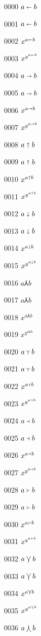 \documentclass{article}
\begin{document}
0000 $a\shortleftarrow b$\par
0001 $\displaystyle a\shortleftarrow b$\par
0002 $x^{a\shortleftarrow b}$\par
0003 $x^{y^{a\shortleftarrow b}}$\par
0004 $a\shortrightarrow b$\par
0005 $\displaystyle a\shortrightarrow b$\par
0006 $x^{a\shortrightarrow b}$\par
0007 $x^{y^{a\shortrightarrow b}}$\par
0008 $a\shortuparrow b$\par
0009 $\displaystyle a\shortuparrow b$\par
0010 $x^{a\shortuparrow b}$\par
0011 $x^{y^{a\shortuparrow b}}$\par
0012 $a\shortdownarrow b$\par
0013 $\displaystyle a\shortdownarrow b$\par
0014 $x^{a\shortdownarrow b}$\par
0015 $x^{y^{a\shortdownarrow b}}$\par
0016 $a\Yup b$\par
0017 $\displaystyle a\Yup b$\par
0018 $x^{a\Yup b}$\par
0019 $x^{y^{a\Yup b}}$\par
0020 $a\Ydown b$\par
0021 $\displaystyle a\Ydown b$\par
0022 $x^{a\Ydown b}$\par
0023 $x^{y^{a\Ydown b}}$\par
0024 $a\Yleft b$\par
0025 $\displaystyle a\Yleft b$\par
0026 $x^{a\Yleft b}$\par
0027 $x^{y^{a\Yleft b}}$\par
0028 $a\Yright b$\par
0029 $\displaystyle a\Yright b$\par
0030 $x^{a\Yright b}$\par
0031 $x^{y^{a\Yright b}}$\par
0032 $a\varcurlyvee b$\par
0033 $\displaystyle a\varcurlyvee b$\par
0034 $x^{a\varcurlyvee b}$\par
0035 $x^{y^{a\varcurlyvee b}}$\par
0036 $a\varcurlywedge b$\par
\end{document}
